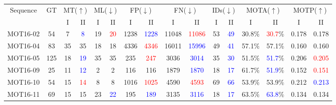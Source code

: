 \begin{landscape}
\begin{table}[H]
    \centering
    \begin{tabular}{||c|c|c|c|c|c|c|c|c|c|c|c|c|c|c|c||}
        \hline
        \multirow{2}{*}{Sequence} & \multirow{2}{*}{GT} & \multicolumn{2}{c|}{MT($\uparrow$)} & \multicolumn{2}{c|}{ML($\downarrow$)} & \multicolumn{2}{c|}{FP($\downarrow$)} & \multicolumn{2}{c|}{FN($\downarrow$)} & \multicolumn{2}{c|}{IDs($\downarrow$)} & \multicolumn{2}{c|}{MOTA($\uparrow$)} & \multicolumn{2}{c|}{MOTP($\uparrow$)} \\ \cline{3-16} 
                 &     & I   &  II                   &   I & II                    &  I   &  II                    &  I            &  II                     & I   & II                   &  I     &    II                     &    I  &    II       \\ \hline
        MOT16-02 & 54  & 7   & \textcolor{blue}{8}   & 19  & \textcolor{red}{20}   & 1238 & \textcolor{blue}{1228} &  11048        & \textcolor{red}{11086}  & 53  & \textcolor{blue}{49} & 30.8\% & \textcolor{red}{30.7}\%   & 0.178 & 0.178          \\ \hline
        MOT16-04 & 83  & 35  & 35                    & 18  & 18                    & 4336 & \textcolor{red}{4346}  &  16011        & \textcolor{blue}{15996} & 49  & \textcolor{blue}{41} & 57.1\% & 57.1\%                    & 0.160 & 0.160         \\ \hline
        MOT16-05 & 125 & 18  & \textcolor{blue}{19}  & 35  & 35                    & 235  & \textcolor{red}{247}   &  3036         & \textcolor{blue}{3014}  & 35  & \textcolor{blue}{30} & 51.5\% & \textcolor{blue}{51.7}\%  & 0.206 & \textcolor{red}{0.205}          \\ \hline
        MOT16-09 & 25  & 11  & \textcolor{blue}{12}  & 2   & 2                     & 116  & 116                    &  1879         & \textcolor{blue}{1870}  & 18  & \textcolor{blue}{17} & 61.7\% & \textcolor{blue}{51.9}\%  & 0.152 & \textcolor{red}{0.151}          \\ \hline
        MOT16-10 & 54  & 15  & \textcolor{red}{14}   & 8   & 8                     & 1016 & \textcolor{red}{1025}  &  4590         & \textcolor{red}{4593}   & 69  & \textcolor{blue}{66} & 53.9\% & 53.9\%                    & 0.212 & \textcolor{blue}{0.213}          \\ \hline
        MOT16-11 & 69  & 15  & 15                    & 23  & \textcolor{blue}{22}  & 195  & \textcolor{blue}{189}  &  3135         & \textcolor{blue}{3116}  & 18  & \textcolor{blue}{17} & 63.5\% & \textcolor{blue}{63.8}\%  & 0.134 & 0.134          \\ \hline

\end{tabular}
\end{table}
\end{landscape}
